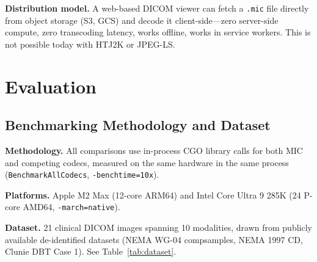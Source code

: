 \documentclass[10pt,twocolumn]{article}
\begin{document}
\textbf{Distribution model.} A web-based DICOM viewer can fetch a \texttt{.mic}
file directly from object storage (S3, GCS) and decode it client-side---zero
server-side compute, zero transcoding latency, works offline, works in service
workers. This is not possible today with HTJ2K or JPEG-LS.

\section{Evaluation}
\label{sec:eval}

\subsection{Benchmarking Methodology and Dataset}

\textbf{Methodology.} All comparisons use in-process CGO library calls for both
MIC and competing codecs, measured on the same hardware in the same process
(\texttt{BenchmarkAllCodecs}, \texttt{-benchtime=10x}).

\textbf{Platforms.} Apple M2 Max (12-core ARM64) and Intel Core Ultra 9 285K
(24 P-core AMD64, \texttt{-march=native}).

\textbf{Dataset.} 21 clinical DICOM images spanning 10 modalities, drawn from
publicly available de-identified datasets (NEMA WG-04 compsamples, NEMA 1997
CD, Clunie DBT Case 1). See Table~\ref{tab:dataset}.
\end{document}
